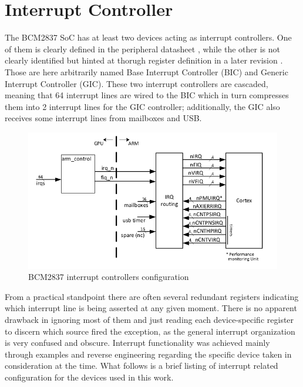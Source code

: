 \documentclass[12pt,a4paper,openright,twoside]{report}
\begin{document}
\newpage

\section{Interrupt Controller}
\label{gic}
The BCM2837 SoC has at least two devices acting as interrupt controllers. One of 
them is clearly defined in the peripheral datasheet \cite{bcm2835}, while the
other is not clearly identified but hinted at thorugh register definition in a later 
revision \cite{rev3.4}. Those are here arbitrarily named Base Interrupt Controller (BIC)
and Generic Interrupt Controller (GIC).
These two interrupt controllers are cascaded, meaning that 64 interrupt lines are 
wired to the BIC which in turn compresses them into 2 interrupt lines for the GIC
controller; additionally, the GIC also receives some interrupt lines from mailboxes
and USB.

 \begin{figure}[h]
 \includegraphics[scale=0.55]{images/tesi3.png}
 \caption[Interrupt Controllers]{BCM2837 interrupt controllers configuration}\label{fig:interrupt}
 \end{figure}
From a practical standpoint there are often several redundant registers indicating which interrupt
line is being asserted at any given moment. There is no apparent drawback in ignoring most
of them and just reading each device-specific register to discern which source fired
the exception, as the general interrupt organization is very confused and obscure. Interrupt functionality
was achieved mainly through examples and reverse engineering regarding the specific
device taken in consideration at the time.
What follows is a brief listing of interrupt related configuration for the devices
used in this work.
\end{document}
